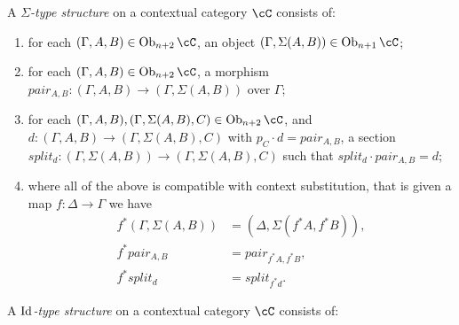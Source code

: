 \begin{defn}
  A \emph{$\Sigma$-type structure} on a contextual category $\cC$ consists of:
  \begin{enumerate}
    \item for each $(\Gamma,A,B)\in\Ob_{n+2}\cC$, an object
      $(\Gamma,\Sigma(A,B))\in\Ob_{n+1}\cC$;
    \item for each $(\Gamma,A,B)\in\Ob_{n+2}\cC$, a morphism $pair_{A,B}\colon
      (\Gamma,A,B)\rightarrow(\Gamma,\Sigma(A,B))$ over $\Gamma$;
    \item for each $(\Gamma,A,B),(\Gamma,\Sigma(A,B),C)\in\Ob_{n+2}\cC$, and
      $d\colon(\Gamma,A,B)\rightarrow(\Gamma,\Sigma(A,B),C)$ with $p_C\cdot
      d=pair_{A,B}$, a section
      $split_d\colon(\Gamma,\Sigma(A,B))\rightarrow(\Gamma,\Sigma(A,B),C)$ such
      that $split_d\cdot pair_{A,B}=d$;
    \item where all of the above is compatible with context substitution, that
      is given a map $f\colon\Delta\rightarrow\Gamma$ we have
      \begin{align*}
        f^*(\Gamma,\Sigma(A,B)) &=(\Delta,\Sigma(f^*A,f^*B)), \\
        f^*pair_{A,B} &=pair_{f^*A,f^*B}, \\
        f^*split_d &=split_{f^*d}.
      \end{align*}
  \end{enumerate}
\end{defn}

\begin{defn}
  A \emph{$\operatorname{Id}$-type structure} on a contextual category $\cC$ consists of:
\end{defn}

